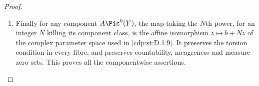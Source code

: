 \begin{proof}
\begin{enumerate}[label={$\langle1\rangle$\arabic*.},leftmargin=*]
\item Finally for any component $A\Pic^0(Y)$, the map taking the $N$th
power, for an integer $N$ killing its component class, is the affine
isomorphism $z\mapsto b+Nz$ of the complex parameter space used
in \ref{cdp:st:D.1.9}. It preserves the torsion condition in every fibre, and
preserves countability, meagreness and measure-zero sets. This
proves all the componentwise assertions.

\end{enumerate}
\end{proof}